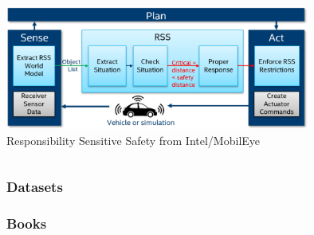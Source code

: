 \begin{frame}
\begin{columns}[T]
\begin{column}{0.65\textwidth}
        \centering
        \includegraphics[width=0.75\textwidth]{images/intel_rss.png}\\
        \vspace{0.15cm}
        \tiny{Responsibility Sensitive Safety from Intel/MobilEye \cite{IntelRSS}}
    \end{column}
\end{columns}
\end{frame}

\begin{frame}
\frametitle{Datasets}

\end{frame}

\begin{frame}
\frametitle{Books}

\end{frame}